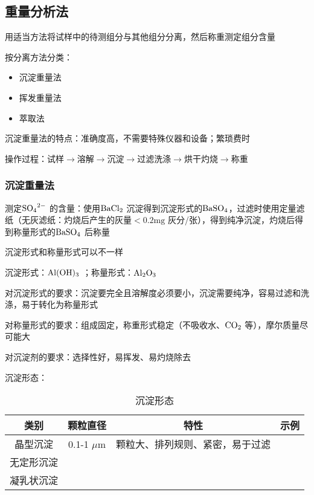 \subsection{重量分析法}%
\label{sub:重量分析法}
\begin{defi}
    用适当方法将试样中的待测组分与其他组分分离，然后称重测定组分含量
\end{defi}
按分离方法分类：\begin{itemize}
    \item 沉淀重量法
    \item 挥发重量法
    \item 萃取法
\end{itemize}
\begin{notation}
    沉淀重量法的特点：准确度高，不需要特殊仪器和设备；繁琐费时

    操作过程：$\text{试样}\to \text{溶解}\to \text{沉淀}\to \text{过滤洗涤}\to \text{烘干灼烧}\to \text{称重}$
\end{notation}
\subsubsection*{沉淀重量法}%
\label{subsub:沉淀重量法}
\begin{eg}
测定$\ce{SO_4^2-}$ 的含量：使用$\ce{BaCl_2}$ 沉淀得到沉淀形式的$\ce{BaSO_4}$，过滤时使用定量滤纸（无灰滤纸：灼烧后产生的灰量$<0.2\text{mg}$ 灰分/张），得到纯净沉淀，灼烧后得到称量形式的$\ce{BaSO_4}$ 后称量
\end{eg}
\begin{notation}
    沉淀形式和称量形式可以不一样
    \begin{eg}
        沉淀形式：$\ce{Al(OH)3}$ ；称量形式：$\ce{Al_2O_3}$
    \end{eg}
    对沉淀形式的要求：沉淀要完全且溶解度必须要小，沉淀需要纯净，容易过滤和洗涤，易于转化为称量形式

    对称量形式的要求：组成固定，称重形式稳定（不吸收水、$\ce{CO_2}$ 等），摩尔质量尽可能大

    对沉淀剂的要求：选择性好，易挥发、易灼烧除去
\end{notation}
\begin{notation}
沉淀形态：
\begin{table}[htpb]
    \centering
    \caption{沉淀形态}
    \label{tab:沉淀形态}
    \begin{tabular}{|c|c|c|c|}
    \hline
    类别 & 颗粒直径 & 特性 & 示例 \\
    \hline
晶型沉淀 & 0.1-1 $\mu$m & 颗粒大、排列规则、紧密，易于过滤 &  \\
\hline
无定形沉淀 &  &  &  \\
\hline
凝乳状沉淀 &  &  &  \\
\hline
    \end{tabular}
\end{table}
\end{notation}
